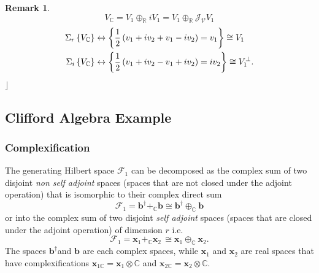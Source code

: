 \documentclass[aps,preprint]{revtex4}
\newtheorem{remark}[theorem]{Remark}
\begin{document}
\begin{remark}
\begin{equation}
V_{\mathbb{C}}=V_{1}\oplus _{\mathbb{R}}iV_{1}=V_{1}\oplus _{\mathbb{R}}%
\mathcal{J}_{\mathcal{V}}V_{1}
\end{equation}%
\begin{align}
\Sigma _{r}\left\{ V_{\mathbb{C}}\right\} & \leftrightarrow \left\{ \frac{1}{%
2}\left( v_{1}+iv_{2}+v_{1}-iv_{2}\right) =v_{1}\right\} \cong V_{1} \\
\Sigma _{i}\left\{ V_{\mathbb{C}}\right\} & \leftrightarrow \left\{ \frac{1}{%
2}\left( v_{1}+iv_{2}-v_{1}+iv_{2}\right) =iv_{2}\right\} \cong V_{1}^{\bot
}.
\end{align}%
$\rfloor $
\end{remark}

\subsection{Clifford Algebra Example}

\subsubsection{Complexification}

The generating Hilbert space $\mathcal{F}_{1}$ can be decomposed as the
complex sum of two disjoint \emph{non self adjoint} spaces (spaces that are
not closed under the adjoint operation) that is isomorphic to their complex
direct sum 
\begin{equation}
\mathcal{F}_{1}=\mathbf{b}^{\dagger }+_{\mathbb{C}}\mathbf{b\cong b}%
^{\dagger }\oplus _{\mathbb{C}}\mathbf{b}
\end{equation}%
or into the complex sum of two disjoint \emph{self adjoint} spaces (spaces
that are closed under the adjoint operation) of dimension $r$ i.e.%
\begin{equation}
\mathcal{F}_{1}=\mathbf{x}_{1}+_{\mathbb{C}}\mathbf{x}_{2}\,\mathbf{\cong x}%
_{1}\oplus _{\mathbb{C}}\mathbf{x}_{2}.
\end{equation}%
The spaces $\mathbf{b}^{\dagger }$and $\mathbf{b}$ are each complex spaces,
while $\mathbf{x}_{1}$ and $\mathbf{x}_{2}$ are real spaces that have
complexifications $\mathbf{x}_{1\mathbb{C}}=\mathbf{x}_{1}\otimes \mathbb{C}$
and $\mathbf{x}_{2\mathbb{C}}=\mathbf{x}_{2}\otimes \mathbb{C}.$
\end{document}
